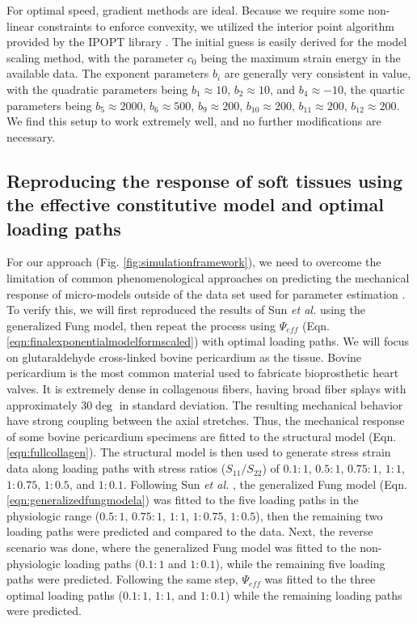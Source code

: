 	For optimal speed, gradient methods are ideal. Because we require some non-linear constraints to enforce convexity, we utilized the interior point algorithm provided by the IPOPT library \cite{waechter_implementation_2005}. The initial guess is easily derived for the model scaling method, with the parameter $c_0$ being the maximum strain energy in the available data. The exponent parameters $b_i$ are generally very consistent in value, with the quadratic parameters being $b_1 \approx 10$, $b_2 \approx 10$, and $b_4 \approx -10$, the quartic parameters being $b_5 \approx 2000$, $b_6 \approx 500$, $b_9 \approx 200$, $b_{10} \approx 200$, $b_{11} \approx 200$, $b_{12} \approx 200$. We find this setup to work extremely well, and no further modifications are necessary. 




\subsection{Reproducing the response of soft tissues using the effective constitutive model and optimal loading paths}\label{sec:reproducefung}

	For our approach (Fig. \ref{fig:simulationframework}), we need to overcome the limitation of common phenomenological approaches on predicting the mechanical response of micro-models outside of the data set used for parameter estimation \cite{sun_biaxial_2003}. To verify this, we will first reproduced the results of Sun \textit{et al.} \cite{sun_biaxial_2003} using the generalized Fung model, then repeat the process using $\Psi_{eff}$ (Eqn. \ref{eqn:finalexponentialmodelformscaled}) with optimal loading paths. We will focus on glutaraldehyde cross-linked bovine pericardium as the tissue. Bovine pericardium is the most common material used to fabricate bioprosthetic heart valves. It is extremely dense in collagenous fibers, having broad fiber splays with approximately $30\deg$ in standard deviation. The resulting mechanical behavior have strong coupling between the axial stretches. Thus, the mechanical response of some bovine pericardium specimens are fitted to the structural model (Eqn. \ref{eqn:fullcollagen}). The structural model is then used to generate stress strain data along loading paths with stress ratios ($S_{11}/S_{22}$) of $0.1:1$, $0.5:1$, $0.75:1$, $1:1$, $1:0.75$, $1:0.5$, and $1:0.1$. Following Sun \textit{et al.} \cite{sun_biaxial_2003}, the generalized Fung model (Eqn. \ref{eqn:generalizedfungmodela}) was fitted to the five loading paths in the physiologic range ($0.5:1$, $0.75:1$, $1:1$, $1:0.75$, $1:0.5$), then the remaining two loading paths were predicted and compared to the data. Next, the reverse scenario was done, where the generalized Fung model was fitted to the non-physiologic loading paths ($0.1:1$ and $1:0.1$), while the remaining five loading paths were predicted. Following the same step, $\Psi_{eff}$ was fitted to the three optimal loading paths ($0.1:1$, $1:1$, and $1:0.1$) while the remaining loading paths were predicted. 
    
